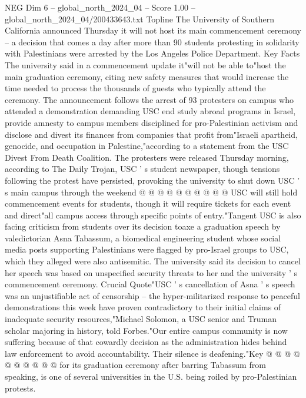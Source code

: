 \begin{textsample}{NEG Dim 6 – global\_north\_2024\_04 – Score 1.00 – global\_north\_2024\_04/200433643.txt}  \label{ex:f6_neg_375}
Topline The University of Southern California announced Thursday it will not host its main commencement ceremony -- a decision that comes a day after more than 90 students protesting in solidarity with Palestinians were arrested by the Los Angeles Police Department.
Key Facts The university said in a commencement update it"will not be able to"host the main graduation ceremony, citing new safety measures that would increase the time needed to process the thousands of guests who typically attend the ceremony.
The announcement follows the arrest of 93 protesters on campus who attended a demonstration demanding USC end study abroad programs in Israel, provide amnesty to campus members disciplined for pro-Palestinian activism and disclose and divest its finances from companies that profit from"Israeli apartheid, genocide, and occupation in Palestine,"according to a statement from the USC Divest From Death Coalition.
The protesters were released Thursday morning, according to The Daily Trojan, USC ' s student newspaper, though tensions following the protest have persisted, provoking the university to shut down USC ' s main campus through the weekend @ @ @ @ @ @ @ @ @ @ USC will still hold commencement events for students, though it will require tickets for each event and direct"all campus access through specific points of entry."Tangent USC is also facing criticism from students over its decision toaxe a graduation speech by valedictorian Asna Tabassum, a biomedical engineering student whose social media posts supporting Palestinians were flagged by pro-Israel groups to USC, which they alleged were also antisemitic.
The university said its decision to cancel her speech was based on unspecified security threats to her and the university ' s commencement ceremony.
Crucial Quote"USC ' s cancellation of Asna ' s speech was an unjustifiable act of censorship -- the hyper-militarized response to peaceful demonstrations this week have proven contradictory to their initial claims of inadequate security resources,"Michael Solomon, a USC senior and Truman scholar majoring in history, told Forbes."Our entire campus community is now suffering because of that cowardly decision as the administration hides behind law enforcement to avoid accountability.
Their silence is deafening."Key @ @ @ @ @ @ @ @ @ @ for its graduation ceremony after barring Tabassum from speaking, is one of several universities in the U.S. being roiled by pro-Palestinian protests.

\end{textsample}
